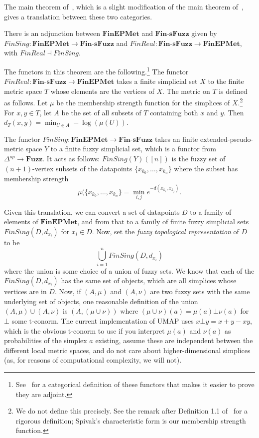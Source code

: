 \documentclass[a4paper,11pt,leqno]{article} \usepackage{amsmath}
\theoremstyle{definition} \newtheorem{defn}{Definition}
\begin{document}
The main theorem of~\cite{McInnes18}, which is a slight modification of the main
theorem of~\cite{Spivak}, gives a translation between these two categories.
\begin{thm} There is an adjunction between $\textbf{FinEPMet}$ and
  $\textbf{Fin-sFuzz}$ given by $FinSing: \textbf{FinEPMet}\to
  \textbf{Fin-sFuzz}$ and $FinReal: \textbf{Fin-sFuzz}\to \textbf{FinEPMet}$,
  with $FinReal\dashv FinSing$.  \end{thm} The functors in this theorem are the
  following.\footnote{ See~\cite{McInnes18} for a categorical definition of
  these functors that makes it easier to prove they are adjoint.} The functor
  $FinReal: \textbf{Fin-sFuzz}\to\textbf{FinEPMet}$ takes a finite simplicial
  set $X$ to the finite metric space $T$ whose elements are the vertices of $X$.
  The metric on $T$ is defined as follows.  Let $\mu$ be the membership strength
  function for the simplices of $X$.\footnote{ We do not define this precisely.
  See the remark after Definition 1.1 of~\cite{Spivak} for a rigorous
  definition; Spivak's characteristic form is our membership strength function.}
  For $x, y\in T$, let $A$ be the set of all subsets of $T$ containing both $x$
  and $y$.  Then $d_T(x, y) = \min_{U\in A} -\log(\mu(U))$.

The functor $FinSing: \textbf{FinEPMet}\to \textbf{Fin-sFuzz}$ takes an finite
extended-pseudo-metric space $Y$ to a finite fuzzy simplicial set, which is
a functor from $\Delta^{op}\to \textbf{Fuzz}$.  It acts as follows:
$FinSing(Y)([n])$ is the fuzzy set of $(n+1)$-vertex subsets of the datapoints
$\{x_{k_0},\ldots,x_{k_n}\}$ where the subset has membership strength
$$\mu(\{x_{k_0},\ldots,x_{k_n}\} = \min_{i, j} e^{-d(x_{k_i}, x_{k_j})}.$$

Given this translation, we can convert a set of datapoints $D$ to a family of
elements of $\textbf{FinEPMet}$, and from that to a family of finite fuzzy
simplicial sets $FinSing(D, d_{x_i})$ for $x_i\in D$.  Now, set the \emph{fuzzy
topological representation} of $D$ to be $$\bigcup_{i=1}^n FinSing(D, d_{x_i})$$
where the union is some choice of a union of fuzzy sets.  We know that each of
the $FinSing(D, d_{x_i})$ has the same set of objects, which are all simplices
whose vertices are in $D$.  Now, if $(A, \mu)$ and $(A, \nu)$ are two fuzzy sets
with the same underlying set of objects, one reasonable definition of the union
$(A, \mu) \cup (A, \nu)$ is $(A, (\mu\cup\nu))$ where $(\mu\cup\nu)(a) = \mu(a)
\bot \nu(a)$ for $\bot$ some t-conorm.  The current implementation of UMAP uses
$x\bot y = x+y-xy$, which is the obvious t-conorm to use if you interpret
$\mu(a)$ and $\nu(a)$ as probabilities of the simplex $a$ existing, assume these
are independent between the different local metric spaces, and do not care about
higher-dimensional simplices (as, for reasons of computational complexity, we
will not).
\end{document}
